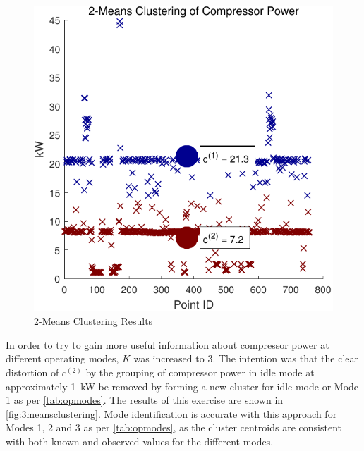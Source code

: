 \begin{figure}
\includegraphics[width = \columnwidth]{./Images/2MeansClustering.pdf}
\caption{2-Means Clustering Results}
\label{fig:twomeansclustering}
\end{figure}

In order to try to gain more useful information about compressor power at different operating modes, $K$ was increased to 3. The intention was that the clear distortion of $c^{(2)}$ by the grouping of compressor power in idle mode at approximately \SI{1}{\kilo \watt} be removed by forming a new cluster for idle mode or Mode 1 as per \autoref{tab:opmodes}. The results of this exercise are shown in \autoref{fig:3meansclustering}. Mode identification is accurate with this approach for Modes 1, 2 and 3 as per \autoref{tab:opmodes}, as the cluster centroids are consistent with both known and observed values for the different modes.

